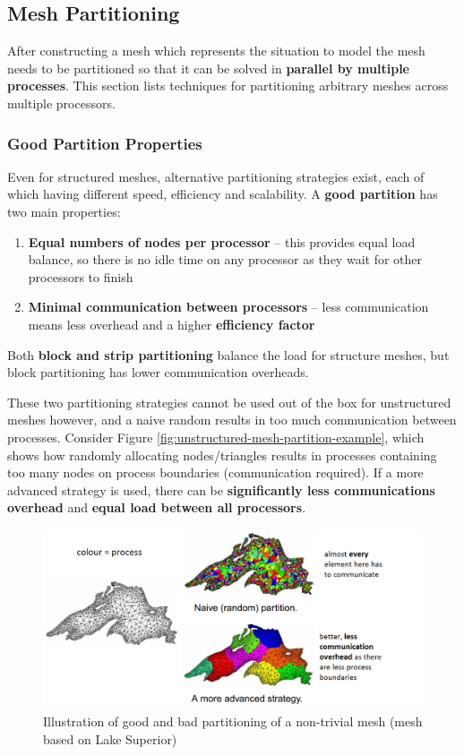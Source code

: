 \documentclass{article}
\begin{document}
\subsection{Mesh Partitioning}
\label{sec:mesh-partitioning}

After constructing a mesh which represents the situation to model the mesh needs to be partitioned so that it can be solved in \textbf{parallel by multiple processes}. This section lists techniques for partitioning arbitrary meshes across multiple processors.

\subsubsection{Good Partition Properties}

Even for structured meshes, alternative partitioning strategies exist, each of which having different speed, efficiency and scalability. A \textbf{good partition} has two main properties:
\begin{enumerate}
	\item \textbf{Equal numbers of nodes per processor} -- this provides equal load balance, so there is no idle time on any processor as they wait for other processors to finish
	\item \textbf{Minimal communication between processors} -- less communication means less overhead and a higher \textbf{efficiency factor}
\end{enumerate}
Both \textbf{block and strip partitioning} balance the load for structure meshes, but block partitioning has lower communication overheads.

These two partitioning strategies cannot be used out of the box for unstructured meshes however, and a naive random results in too much communication between processes. Consider Figure \ref{fig:unstructured-mesh-partition-example}, which shows how randomly allocating nodes/triangles results in processes containing too many nodes on process boundaries (communication required). If a more advanced strategy is used, there can be \textbf{significantly less communications overhead} and \textbf{equal load between all processors}.

\begin{figure}
	\centering
	\includegraphics[scale=0.3]{figures/lake-superior.png}
	\caption{Illustration of good and bad partitioning of a non-trivial mesh (mesh based on Lake Superior)}
	\label{fig:lake-superior}
\end{figure}
\end{document}
